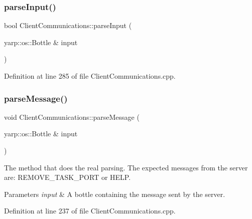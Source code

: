 \subsubsection{\texorpdfstring{parse\+Input()}{parseInput()}}
{\footnotesize\ttfamily bool Client\+Communications\+::parse\+Input (\begin{DoxyParamCaption}\item[{yarp\+::os\+::\+Bottle \&}]{input }\end{DoxyParamCaption})}



Definition at line 285 of file Client\+Communications.\+cpp.

\hypertarget{classocra__recipes_1_1ClientCommunications_a452774799b5d8448a8ffd3ab5d24aa22}{}\label{classocra__recipes_1_1ClientCommunications_a452774799b5d8448a8ffd3ab5d24aa22} 
\subsubsection{\texorpdfstring{parse\+Message()}{parseMessage()}}
{\footnotesize\ttfamily void Client\+Communications\+::parse\+Message (\begin{DoxyParamCaption}\item[{yarp\+::os\+::\+Bottle \&}]{input }\end{DoxyParamCaption})}

The method that does the real parsing. The expected messages from the server are\+: R\+E\+M\+O\+V\+E\+\_\+\+T\+A\+S\+K\+\_\+\+P\+O\+RT or H\+E\+LP.


\begin{DoxyParams}{Parameters}
{\em input} & A bottle containing the message sent by the server. \\
\hline
\end{DoxyParams}


Definition at line 237 of file Client\+Communications.\+cpp.

\hypertarget{classocra__recipes_1_1ClientCommunications_a555bf79c855b3c08402a5ba4d6f9410c}{}\label{classocra__recipes_1_1ClientCommunications_a555bf79c855b3c08402a5ba4d6f9410c} 
